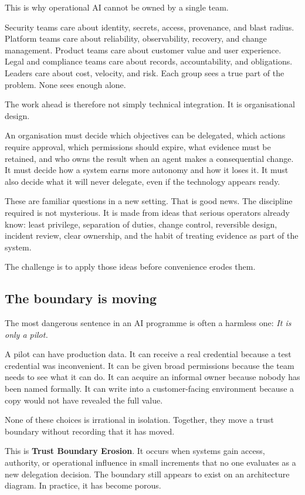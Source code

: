 This is why operational AI cannot be owned by a single team.

Security teams care about identity, secrets, access, provenance, and
blast radius. Platform teams care about reliability, observability,
recovery, and change management. Product teams care about customer value
and user experience. Legal and compliance teams care about records,
accountability, and obligations. Leaders care about cost, velocity, and
risk. Each group sees a true part of the problem. None sees enough
alone.

The work ahead is therefore not simply technical integration. It is
organisational design.

An organisation must decide which objectives can be delegated, which
actions require approval, which permissions should expire, what evidence
must be retained, and who owns the result when an agent makes a
consequential change. It must decide how a system earns more autonomy
and how it loses it. It must also decide what it will never delegate,
even if the technology appears ready.

These are familiar questions in a new setting. That is good news. The
discipline required is not mysterious. It is made from ideas that
serious operators already know: least privilege, separation of duties,
change control, reversible design, incident review, clear ownership, and
the habit of treating evidence as part of the system.

The challenge is to apply those ideas before convenience erodes them.

\subsection{The boundary is moving}\label{the-boundary-is-moving}

The most dangerous sentence in an AI programme is often a harmless one:
\emph{It is only a pilot.}

A pilot can have production data. It can receive a real credential
because a test credential was inconvenient. It can be given broad
permissions because the team needs to see what it can do. It can acquire
an informal owner because nobody has been named formally. It can write
into a customer-facing environment because a copy would not have
revealed the full value.

None of these choices is irrational in isolation. Together, they move a
trust boundary without recording that it has moved.

This is \textbf{Trust Boundary Erosion}. It occurs when systems gain
access, authority, or operational influence in small increments that no
one evaluates as a new delegation decision. The boundary still appears
to exist on an architecture diagram. In practice, it has become porous.

